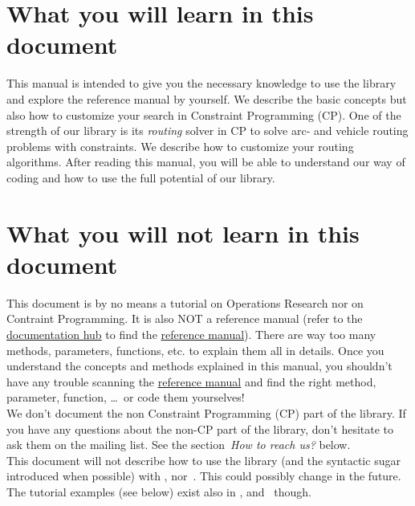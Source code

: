 \begin{titlepage}
\section*{What you will learn in this document}

This manual is intended to give you the necessary knowledge to use the library and explore the reference manual by yourself. We describe the basic concepts but also
how to customize your search in Constraint Programming (CP). One of the strength of our library is its \emph{routing} solver in CP to solve arc- and vehicle routing problems with constraints.
We describe how to customize your routing algorithms. After reading this manual, you will be able to understand our way of coding and how to use the
full potential of our library. 
    
\section*{What you will not learn in this document}

This document is by no means a tutorial on Operations Research nor on Contraint Programming. 
It is also NOT a reference manual (refer to the \href{http://or-tools.googlecode.com/svn/trunk/documentation/documentation_hub.html}{documentation hub} to find the \href{http://or-tools.googlecode.com/svn/trunk/documentation/reference_manual/or-tools/index.html}{reference manual}).
There are way too many methods, parameters, functions, etc. to explain them all in details. Once you understand the concepts and methods explained in this manual, you shouldn't have any trouble scanning the
\href{http://or-tools.googlecode.com/svn/trunk/documentation/reference_manual/or-tools/index.html}{reference manual} and find the right method, parameter, function, \ldots\ or code them yourselves!\\

We don't document the non Constraint Programming (CP) part of the library. If you have any questions about the non-CP part of the library, don't hesitate to ask
them on the mailing list. See the section~\emph{How to reach us?} below.\\

This document will not describe how to use the library (and the syntactic sugar introduced when possible) with ,  nor~. This could possibly change in the future. The tutorial examples (see below) exist also in ,  and~ though. 


\end{titlepage}

